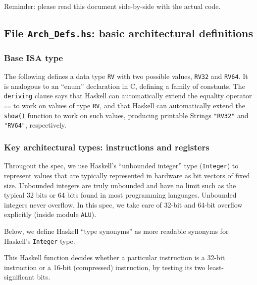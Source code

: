 \documentclass[11pt]{article}
\begin{document}
Reminder: please read this document side-by-side with the actual code.


\subsection{File {\tt Arch\_Defs.hs}: basic architectural definitions}

\label{sec_arch_defs}


\subsubsection{Base ISA type}

The following defines a data type {\tt RV} with two possible values,
{\tt RV32} and {\tt RV64}.  It is analogous to an ``enum'' declaration
in C, defining a family of constants.  The {\tt deriving} clause says
that Haskell can automatically extend the equality operator {\tt ==}
to work on values of type {\tt RV}, and that Haskell can automatically
extend the {\tt show()} function to work on such values, producing
printable Strings {\tt "RV32"} and {\tt "RV64"}, respectively.




\subsubsection{Key architectural types: instructions and registers}

Througout the spec, we use Haskell's ``unbounded integer'' type
(\verb'Integer') to represent values that are typically represented in
hardware as bit vectors of fixed size.  Unbounded integers are truly
unbounded and have no limit such as the typical 32 bits or 64 bits
found in most programming languages.  Unbounded integers never
overflow. In this spec, we take care of 32-bit and 64-bit overflow
explicitly (inside module \verb|ALU|).

Below, we define Haskell ``type synonyms'' as more readable synonyms
for Haskell's {\tt Integer} type.



This Haskell function decides whether a particular instruction is a
32-bit instruction or a 16-bit (compressed) instruction, by testing
its two least-significant bits.
\end{document}
